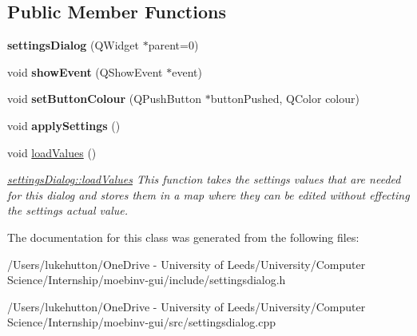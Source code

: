 \subsection*{Public Member Functions}
\begin{DoxyCompactItemize}
\item 
\mbox{\label{classsettings_dialog_abe3d7f1c14fb45723918ae6bd0f999fa}} 
{\bfseries settings\+Dialog} (Q\+Widget $\ast$parent=0)
\item 
\mbox{\label{classsettings_dialog_a12dcaa04ce60f151ae7b77ce5ce2610d}} 
void {\bfseries show\+Event} (Q\+Show\+Event $\ast$event)
\item 
\mbox{\label{classsettings_dialog_a6f5b6ea59e6a2de876fee96f0a5501da}} 
void {\bfseries set\+Button\+Colour} (Q\+Push\+Button $\ast$button\+Pushed, Q\+Color colour)
\item 
\mbox{\label{classsettings_dialog_afca53b725fce559f74266bb39657da6b}} 
void {\bfseries apply\+Settings} ()
\item 
\mbox{\label{classsettings_dialog_a982beae131fefc2788432b192ec343c7}} 
void \mbox{\hyperlink{classsettings_dialog_a982beae131fefc2788432b192ec343c7}{load\+Values}} ()
\begin{DoxyCompactList}\small\item\em \mbox{\hyperlink{classsettings_dialog_a982beae131fefc2788432b192ec343c7}{settings\+Dialog\+::load\+Values}} This function takes the settings values that are needed for this dialog and stores them in a map where they can be edited without effecting the settings actual value. \end{DoxyCompactList}\end{DoxyCompactItemize}


The documentation for this class was generated from the following files\+:\begin{DoxyCompactItemize}
\item 
/\+Users/lukehutton/\+One\+Drive -\/ University of Leeds/\+University/\+Computer Science/\+Internship/moebinv-\/gui/include/settingsdialog.\+h\item 
/\+Users/lukehutton/\+One\+Drive -\/ University of Leeds/\+University/\+Computer Science/\+Internship/moebinv-\/gui/src/settingsdialog.\+cpp\end{DoxyCompactItemize}
